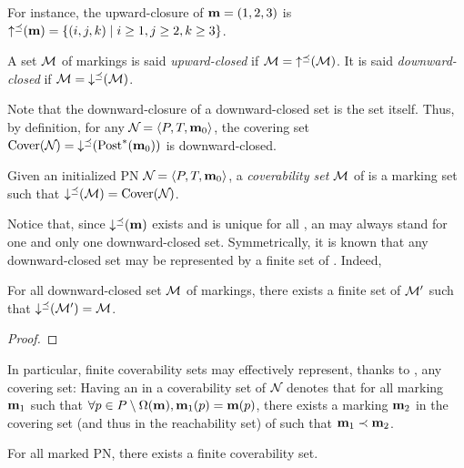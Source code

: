 For instance, the upward-closure of $\mathbf{m} = (1, 2, 3)$ is $\operatorname{\uparrow^\preceq}(\mathbf{m}) = \left\{(i, j, k) \mid i \geq 1, j \geq 2, k \geq 3\right\}$.

\begin{defi}
  A set $\mathcal{M}$ of markings is said \emph{upward-closed} if $\mathcal{M} = \operatorname{\uparrow^\preceq}(\mathcal{M})$.
  It is said \emph{downward-closed} if $\mathcal{M} = \operatorname{\downarrow^\preceq}(\mathcal{M})$.
\end{defi}

Note that the downward-closure of a downward-closed set is the set itself.
Thus, by definition, for any $\defPN$, the covering set $\operatorname{Cover}(\mathcal{N}_{}) = \operatorname{\downarrow^\preceq}(\operatorname{Post}^*_{{}}(\mathbf{m}_0))$ is downward-closed.

\begin{defi}
  Given an initialized \ac{PN} $\defPN$, a \emph{coverability set} $\mathcal{M}$ of \namePN is a marking set  such that $\operatorname{\downarrow^\preceq}(\mathcal{M}) = \operatorname{Cover}(\mathcal{N}_{})$.
\end{defi}

Notice that, since $\operatorname{\downarrow^\preceq}(\mathbf{m})$ exists and is unique for all \omark \mar, an \omark may always stand for one and only one downward-closed set.
Symmetrically, it is known that any downward-closed set may be represented by a finite set of \omarks \cite{Abdulla96,Geeraerts06}. Indeed,

\begin{lemm}
  \label{theo:repr-downc-sets}
  For all downward-closed set $\mathcal{M}$ of markings, there exists a finite set of \omarks $\mathcal{M}'$ such that $\operatorname{\downarrow^\preceq}(\mathcal{M}') = \mathcal{M}$.
\end{lemm}

\begin{proof}
\end{proof}

In particular, finite coverability sets may effectively represent, thanks to \omarks, any covering set:
Having an \omark \mar in a coverability set of $\mathcal{N}_{}$ denotes that for all marking $\mathbf{m}_1$ such that $\forall p \in P \setminus \operatorname{\Omega}(\mathbf{m}), \mathbf{m}_1(p) = \mathbf{m}(p)$, there exists a marking $\mathbf{m}_2$ in the covering set (and thus in the reachability set) of \namePN such that $\mathbf{m}_1 \prec \mathbf{m}_2$.

\begin{lemm}
  \label{theo:finite-coverability-set}
  For all marked PN, there exists a finite coverability set.
\end{lemm}

